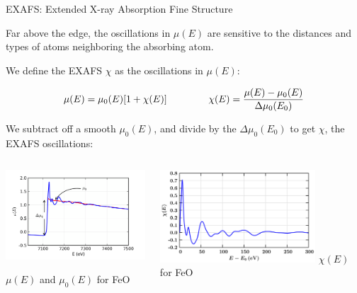 
 \begin{slide}{EXAFS: Extended X-ray Absorption Fine Structure}

 \begin{cenpage}{140mm}

   Far above the edge, the oscillations in $\mu(E)$ are sensitive to the
   distances and types of atoms neighboring the absorbing atom.  \vmm

  We define the EXAFS $\chi$ as the oscillations in $\mu(E)$:

   \[
     \mu(E) =   \mu_0(E) [1 + \chi(E)]
     \hspace{15mm} \chi(E) =   \frac{ {\mu(E) - \mu_0(E)}}{\Delta \mu_0(E_0)}
   \]

   We subtract off a smooth {}
   $\mu_0(E)$, and divide by the {}
   $\Delta \mu_0(E_0)$ to get $\chi$, the EXAFS oscillations:

   \begin{columns}[T]
     \begin{column}{65mm}
       \includegraphics[width=58mm]{figs/rimg/mu_with_mu0}

       \hspace{10mm} $\mu(E)$ and $\mu_0(E)$ for FeO       
     \end{column}
     \begin{column}{65mm}
       \includegraphics[width=58mm]{figs/rimg/chie}
       \hspace{10mm} $\chi(E)$ for FeO
     \end{column}     
   \end{columns}

 \end{cenpage}

 \vfill
\end{slide}


